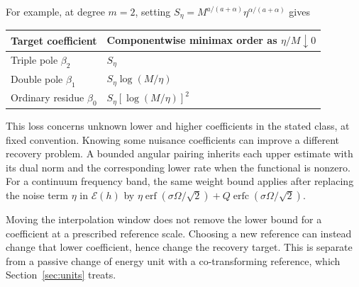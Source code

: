 For example, at degree $m=2$, setting
$S_\eta=M^{a/(a+\alpha)}\eta^{\alpha/(a+\alpha)}$ gives
\begin{center}
\begin{tabular}{ll}
\toprule
Target coefficient & Componentwise minimax order as $\eta/M\downarrow0$\\
\midrule
Triple pole $\beta_2$ & $S_\eta$\\
Double pole $\beta_1$ & $S_\eta\log(M/\eta)$\\
Ordinary residue $\beta_0$ & $S_\eta[\log(M/\eta)]^2$\\
\bottomrule
\end{tabular}
\end{center}
This loss concerns unknown lower and higher coefficients in the stated
class, at fixed convention. Knowing some nuisance coefficients can
improve a different recovery problem. A bounded angular pairing
inherits each upper estimate with its dual norm and the corresponding
lower rate when the functional is nonzero. For a continuum frequency
band, the same weight bound applies after replacing the noise term
$\eta$ in $\mathcal E(h)$ by
$\eta\operatorname{erf}(\sigma\Omega/\sqrt2)
+Q\operatorname{erfc}(\sigma\Omega/\sqrt2)$.

Moving the interpolation window does not remove the lower bound for a
coefficient at a prescribed reference scale. Choosing a new reference
can instead change that lower coefficient, hence change the recovery
target. This is separate from a passive change of energy unit with a
co-transforming reference, which Section~\ref{sec:units} treats.
